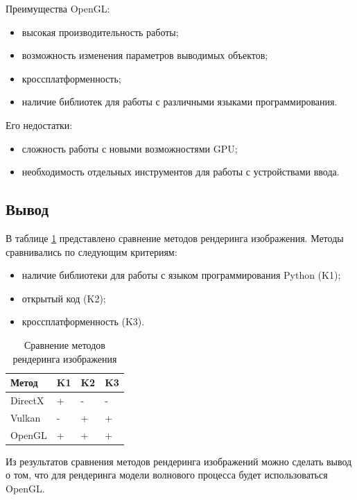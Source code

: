 Преимущества OpenGL:

\begin{itemize}
	\item высокая производительность работы;
	\item возможность изменения параметров выводимых объектов;
	\item кроссплатформенность;
	\item наличие библиотек для работы с различными языками программирования.
\end{itemize}

Его недостатки:
\begin{itemize}
	\item сложность работы с новыми возможностями GPU;
	\item необходимость отдельных инструментов для работы с устройствами ввода.
\end{itemize}

\subsection*{Вывод}

В таблице \ref{tab:opengl} представлено сравнение методов рендеринга изображения. Методы сравнивались по следующим критериям:

\begin{itemize}
	\item наличие библиотеки для работы с языком программирования Python (K1);
	\item открытый код (K2);
	\item кроссплатформенность (K3).
\end{itemize}

\begin{table}[h]
    \caption{Сравнение методов рендеринга изображения}
    \begin{center}
        \begin{tabular}{|l|l|l|l|}
            \hline
            Метод & K1 & K2 & K3 \\ \hline
            DirectX & + & - & - \\ \hline
		    Vulkan & - & + & + \\ \hline
            OpenGL & + & + & + \\ \hline
        \end{tabular}
    \end{center}
    \label{tab:opengl}
\end{table}

Из результатов сравнения методов рендеринга изображений можно сделать вывод о том, что для рендеринга модели волнового процесса будет использоваться OpenGL.

